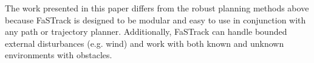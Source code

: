 The work presented in this paper differs from the robust planning methods above because FaSTrack is designed to be modular and easy to use in conjunction with any path or trajectory planner. Additionally, FaSTrack can handle bounded external disturbances (e.g. wind) and work with both known and unknown environments with obstacles.
